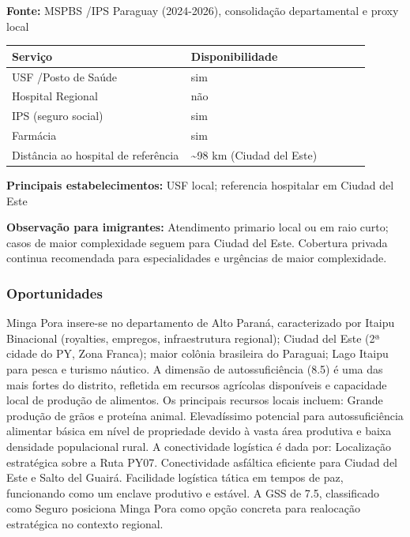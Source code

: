 \textbf{Fonte:} MSPBS /\allowbreak  IPS Paraguay (2024-2026), consolidação
departamental e proxy local

{\def\LTcaptype{none} %
\begin{longtable}{@{}>{\raggedright\arraybackslash}p{0.45\linewidth} >{\raggedright\arraybackslash}p{0.45\linewidth}@{}}
\toprule\noalign{}
Serviço & Disponibilidade \\
\midrule\noalign{}
\endhead
\bottomrule\noalign{}
\endlastfoot
USF /\allowbreak  Posto de Saúde & sim \\
Hospital Regional & não \\
IPS (seguro social) & sim \\
Farmácia & sim \\
Distância ao hospital de referência & \textasciitilde98 km (Ciudad del
Este) \\
\end{longtable}
}

\textbf{Principais estabelecimentos:} USF local; referencia hospitalar
em Ciudad del Este

\textbf{Observação para imigrantes:} Atendimento primario local ou em
raio curto; casos de maior complexidade seguem para Ciudad del Este.
Cobertura privada continua recomendada para especialidades e urgências
de maior complexidade.
\newpage

\subsubsection*{Oportunidades}\label{oport-minga-pora-1016}
Minga Pora insere-se no departamento de Alto Paraná, caracterizado por Itaipu Binacional (royalties, empregos, infraestrutura regional); Ciudad del Este (2ª cidade do PY, Zona Franca); maior colônia brasileira do Paraguai; Lago Itaipu para pesca e turismo náutico. A dimensão de autossuficiência (8.5) é uma das mais fortes do distrito, refletida em recursos agrícolas disponíveis e capacidade local de produção de alimentos. Os principais recursos locais incluem: Grande produção de grãos e proteína animal. Elevadíssimo potencial para autossuficiência alimentar básica em nível de propriedade devido à vasta área produtiva e baixa densidade populacional rural. A conectividade logística é dada por: Localização estratégica sobre a Ruta PY07. Conectividade asfáltica eficiente para Ciudad del Este e Salto del Guairá. Facilidade logística tática em tempos de paz, funcionando como um enclave produtivo e estável. A GSS de 7.5, classificado como Seguro posiciona Minga Pora como opção concreta para realocação estratégica no contexto regional.

